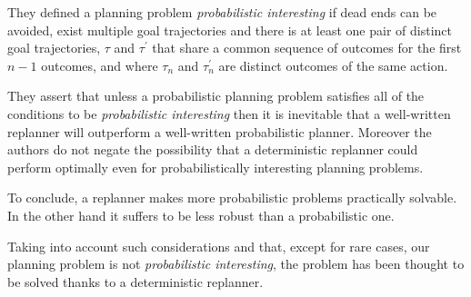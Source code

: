 They defined a planning problem \textit{probabilistic interesting} if dead ends can be avoided,
exist multiple goal trajectories and there is at least one pair of distinct goal trajectories, $\tau$ and $\tau^{'}$ that share a common sequence of outcomes for the first $n-1$ outcomes, and where $\tau_{n}$ and $\tau_{n}^{'}$ are distinct outcomes of the same action. 

They assert that unless a probabilistic planning problem satisfies all of the conditions to be \textit{probabilistic interesting} then it is inevitable that a well-written replanner will outperform a well-written probabilistic planner. Moreover the authors do not negate the possibility that a deterministic replanner could perform optimally even for probabilistically interesting planning problems. 

To conclude, a replanner makes more probabilistic problems practically solvable. In the other hand it suffers to be less robust than a probabilistic one. 

Taking into account such considerations and that, except for rare cases, our planning problem is not \textit{probabilistic interesting}, the problem has been thought to be solved thanks to a deterministic replanner.


